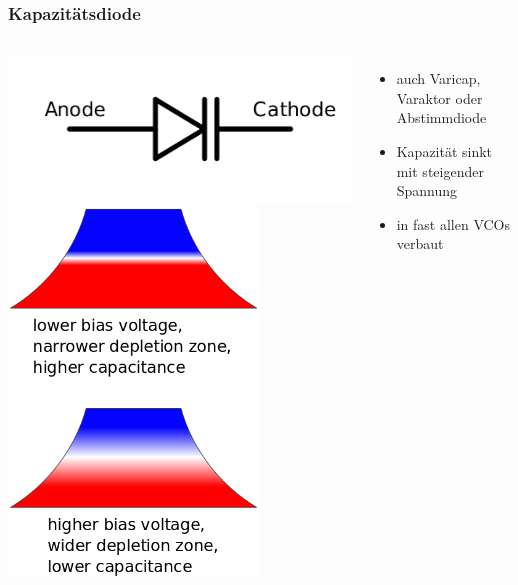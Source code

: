 \begin{frame}
    \frametitle{Kapazitätsdiode}
        \begin{columns}[c]
        \column[c]{5cm}
        \begin{center}
            \includegraphics[width=1\textwidth]{a05/Varicap_symbol.png}\\
            \includegraphics[width=0.73\textwidth]{a05/Varactor_function.png}
            \tiny \hyperlink{refs}{\cite{wm}}
        \end{center}
        \column{5cm}
    \begin{itemize}
			\item auch Varicap, Varaktor oder Abstimmdiode
			\item Kapazität sinkt mit steigender Spannung
			\item in fast allen VCOs verbaut
    \end{itemize}
    \end{columns}
\end{frame}

